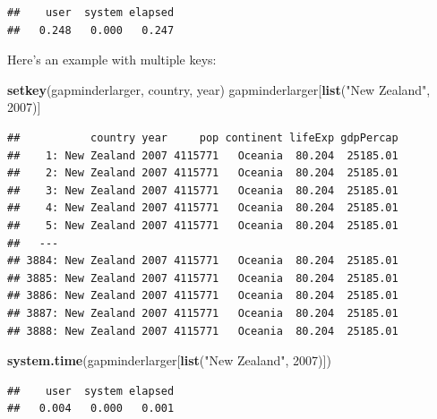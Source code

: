 \documentclass[]{article}
\newenvironment{Shaded}{\begin{snugshade}}{\end{snugshade}}
\newcommand{\KeywordTok}[1]{\textcolor[rgb]{0.13,0.29,0.53}{\textbf{{#1}}}}
\newcommand{\DecValTok}[1]{\textcolor[rgb]{0.00,0.00,0.81}{{#1}}}
\newcommand{\StringTok}[1]{\textcolor[rgb]{0.31,0.60,0.02}{{#1}}}
\newcommand{\NormalTok}[1]{{#1}}
\begin{document}
\begin{verbatim}
##    user  system elapsed 
##   0.248   0.000   0.247
\end{verbatim}

Here's an example with multiple keys:

\begin{Shaded}
\begin{Highlighting}[]
\KeywordTok{setkey}\NormalTok{(gapminderlarger, country, year)}
\NormalTok{gapminderlarger[}\KeywordTok{list}\NormalTok{(}\StringTok{"New Zealand"}\NormalTok{, }\DecValTok{2007}\NormalTok{)]}
\end{Highlighting}
\end{Shaded}

\begin{verbatim}
##           country year     pop continent lifeExp gdpPercap
##    1: New Zealand 2007 4115771   Oceania  80.204  25185.01
##    2: New Zealand 2007 4115771   Oceania  80.204  25185.01
##    3: New Zealand 2007 4115771   Oceania  80.204  25185.01
##    4: New Zealand 2007 4115771   Oceania  80.204  25185.01
##    5: New Zealand 2007 4115771   Oceania  80.204  25185.01
##   ---                                                     
## 3884: New Zealand 2007 4115771   Oceania  80.204  25185.01
## 3885: New Zealand 2007 4115771   Oceania  80.204  25185.01
## 3886: New Zealand 2007 4115771   Oceania  80.204  25185.01
## 3887: New Zealand 2007 4115771   Oceania  80.204  25185.01
## 3888: New Zealand 2007 4115771   Oceania  80.204  25185.01
\end{verbatim}

\begin{Shaded}
\begin{Highlighting}[]
\KeywordTok{system.time}\NormalTok{(gapminderlarger[}\KeywordTok{list}\NormalTok{(}\StringTok{"New Zealand"}\NormalTok{, }\DecValTok{2007}\NormalTok{)])}
\end{Highlighting}
\end{Shaded}

\begin{verbatim}
##    user  system elapsed 
##   0.004   0.000   0.001
\end{verbatim}

\begin{Shaded}
\end{Shaded}
\end{document}
